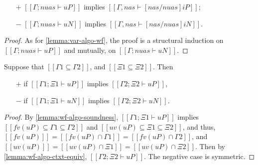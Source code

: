 \begin{lemma}
  \label{lemma:var-dealgo-wf}
  \hfill
  \begin{itemize}
    \item[$+$]  $[[Γ; {nuas} ⊢ uP]]$ implies $[[Γ, nas ⊢ [nas/nuas]iP]]$;
    \item[$-$]  $[[Γ; {nuas} ⊢ uN]]$ implies $[[Γ, nas ⊢ [nas/nuas]iN]]$.
  \end{itemize}
\end{lemma}
\begin{proof}
  As for \cref{lemma:var-algo-wf}, the proof is a structural induction on 
  $[[Γ; {nuas} ⊢ uP]]$ and mutually, on $[[Γ; {nuas} ⊢ uN]]$.
\end{proof}


\begin{corollary}
  \label{lemma:wf-weakening-algo}
  Suppose that $[[Γ1 ⊆ Γ2]]$,
  and $[[Ξ1 ⊆ Ξ2]]$. Then
  \begin{itemize}
    \item[$+$] if $[[Γ1 ; Ξ1 ⊢ uP]]$ implies $[[Γ2 ; Ξ2 ⊢ uP]]$,
    \item [$-$] if $[[Γ1 ; Ξ1 ⊢ uN]]$ implies $[[Γ2 ; Ξ2 ⊢ uN]]$.
  \end{itemize}
\end{corollary}
\begin{proof}
  By \cref{lemma:wf-algo-soundness},
  $[[Γ1; Ξ1 ⊢ uP]]$ implies $[[fv(uP) ⊆ Γ1 ⊆ Γ2]]$
  and $[[uv(uP) ⊆ Ξ1 ⊆ Ξ2]]$,
  and thus, $[[fv(uP)]] = [[fv(uP) ∩ Γ1]] = [[fv(uP) ∩ Γ2]]$, 
  and $[[uv(uP)]] = [[uv(uP) ∩ Ξ1]] = [[uv(uP) ∩ Ξ2]]$.
  Then by \cref{lemma:wf-algo-ctxt-equiv}, $[[Γ2; Ξ2 ⊢ uP]]$. 
  The negative case is symmetric.
\end{proof}